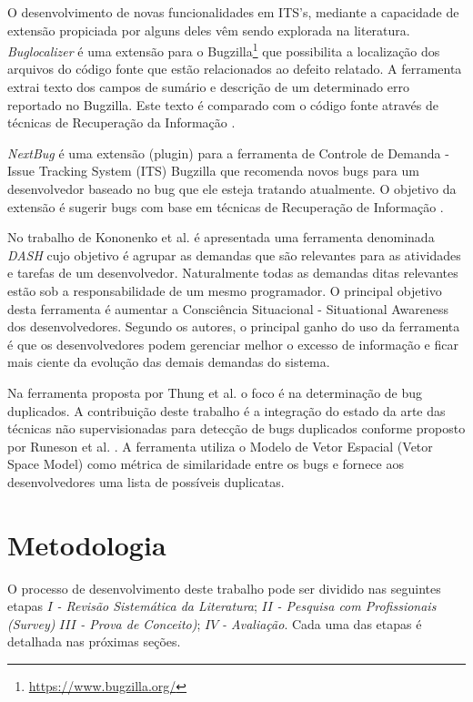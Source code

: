 \documentclass[msc,proposal,hidelot,hideabstract]{ppgccufmg} %
\begin{document}
O desenvolvimento de novas funcionalidades em ITS's, mediante a capacidade de
extensão propiciada por alguns deles vêm sendo explorada na literatura. \textit{Buglocalizer} \cite{Thung:2014:BIT:2635868.2661678} é uma extensão para o Bugzilla\footnote{\url{https://www.bugzilla.org/}} que possibilita a
localização dos arquivos do código fonte que estão relacionados ao defeito
relatado. A ferramenta extrai texto dos campos de sumário e descrição de um
determinado erro reportado no Bugzilla. Este texto é comparado com o código
fonte através de técnicas de Recuperação da Informação \cite{baeza1999modern}.

\textit{NextBug} \cite{101186} é uma extensão (plugin) para a ferramenta de Controle de Demanda -
Issue Tracking System (ITS) Bugzilla que recomenda novos bugs para um desenvolvedor baseado no bug que ele esteja
tratando atualmente. O objetivo da extensão é sugerir bugs com base em técnicas de
Recuperação de Informação \cite{baeza1999modern}.

No trabalho de Kononenko et al. \cite{Kononenko:2014:DED:2591062.2591075} é
apresentada uma ferramenta denominada \textit{DASH} cujo objetivo é agrupar as
demandas que são relevantes para as atividades e tarefas de um
desenvolvedor. Naturalmente todas as demandas ditas relevantes estão sob a
responsabilidade de um mesmo programador. O principal objetivo desta
ferramenta é aumentar a Consciência Situacional - Situational Awareness dos
desenvolvedores. Segundo os autores, o principal ganho do uso da ferramenta é
que os desenvolvedores podem gerenciar melhor o excesso de informação e ficar
mais ciente da evolução das demais demandas do sistema.


Na ferramenta proposta por Thung et al. \cite{Thung:2014:DIT:2642937.2648627} o
foco é na determinação de bug duplicados. A contribuição deste trabalho é a
integração do estado da arte das técnicas não supervisionadas para detecção de
bugs duplicados conforme proposto por Runeson et
al. \cite{Runeson:2007:DDD:1248820.1248882}. A ferramenta utiliza o Modelo de
Vetor Espacial (Vetor Space Model) como métrica de similaridade entre os bugs e
fornece aos desenvolvedores uma lista de possíveis duplicatas.

\chapter{Metodologia}
\label{ch:metodologia}

O processo de desenvolvimento deste trabalho pode ser dividido nas seguintes
etapas $I$\textit{ - Revisão Sistemática da Literatura}; $II$\textit{ - Pesquisa
  com Profissionais (Survey)} $III$\textit{ - Prova de Conceito)}; $IV$\textit{ - Avaliação}. Cada uma das etapas é detalhada nas próximas seções.
\end{document}
